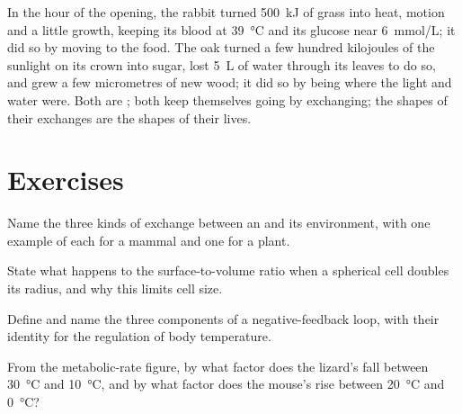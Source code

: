 \begin{example}\label{ex:b1:organism-environment:budgets}
In the hour of the opening, the rabbit turned \qty{500}{kJ} of grass
into heat, motion and a little growth, keeping its blood at
\qty{39}{\celsius} and its glucose near \qty{6}{mmol/L}; it did so by
moving to the food. The oak turned a few hundred kilojoules of the
sunlight on its crown into sugar, lost \qty{5}{L} of water through its
leaves to do so, and grew a few micrometres of new wood; it did so by
being where the light and water were. Both are ; both keep
themselves going by exchanging; the shapes of their exchanges are the
shapes of their lives.
\end{example}

\section{Exercises}

\begin{exercise}[$\star$]\label{exo:b1:organism-environment:1}
Name the three kinds of exchange between an  and its
environment, with one example of each for a mammal and one for a plant.
\end{exercise}

\begin{exercise}[$\star$]\label{exo:b1:organism-environment:2}
State what happens to the surface-to-volume ratio when a spherical cell
doubles its radius, and why this limits cell size.
\end{exercise}

\begin{exercise}[$\star$]\label{exo:b1:organism-environment:3}
Define  and name the three components of a negative-feedback
loop, with their identity for the regulation of body temperature.
\end{exercise}

\begin{exercise}[$\star$]\label{exo:b1:organism-environment:4}
From the metabolic-rate figure, by what factor does the lizard's
 fall between \qty{30}{\celsius} and \qty{10}{\celsius},
and by what factor does the mouse's rise between \qty{20}{\celsius} and
\qty{0}{\celsius}?
\end{exercise}

